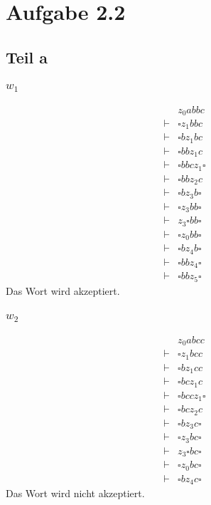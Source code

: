 \documentclass[10pt,a4paper]{article}
\begin{document}
\section{Aufgabe 2.2}

\subsection{Teil a}

\subsubsection{$w_{1}$}

\begin{align*}
  & z_{0}abbc\\
  \vdash & \square z_{1}bbc\\
  \vdash & \square bz_{1}bc\\
  \vdash & \square bbz_{1}c\\
  \vdash & \square bbcz_{1}\square\\
  \vdash & \square bbz_{2}c\\
  \vdash & \square bz_{3}b\square\\
  \vdash & \square z_{3}bb\square\\
  \vdash & z_{3} \square bb\square\\
  \vdash & \square z_{0}bb\square\\
  \vdash & \square bz_{4}b\square\\
  \vdash & \square bbz_{4}\square\\
  \vdash & \square bbz_{5}\square
\end{align*}
Das Wort wird akzeptiert.

\subsubsection{$w_{2}$}

\begin{align*}
  & z_{0}abcc\\
  \vdash & \square z_{1}bcc\\
  \vdash & \square bz_{1}cc\\
  \vdash & \square bcz_{1}c\\
  \vdash & \square bccz_{1}\square\\
  \vdash & \square bcz_{2}c\\
  \vdash & \square bz_{3}c\square\\
  \vdash & \square z_{3}bc\square\\
  \vdash & z_{3}\square bc\square\\
  \vdash & \square z_{0}bc\square\\
  \vdash & \square bz_{4}c\square
\end{align*}
Das Wort wird nicht akzeptiert.
\end{document}
